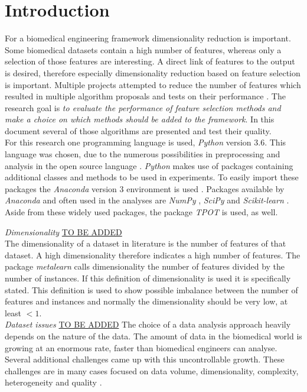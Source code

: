 \documentclass[10pt,a4paper]{report}
\begin{document}
	\section{Introduction}
	\label{FSsec:Introduction}
	
	For a biomedical engineering framework dimensionality reduction is important.  Some biomedical datasets contain a high number of features, whereas only a selection of those features are interesting. A direct link of features to the output is desired, therefore especially dimensionality reduction based on feature selection is important. Multiple projects attempted to reduce the number of features \cite{baumgartner2006data, welthagen2005comprehensive} which resulted in multiple algorithm proposals \cite{lim2003planar, peng2010novel, biesiada2007feature, ding2005minimum} and tests on their performance \cite{catal2009investigating, liu2002comparative}. The research goal is \emph{to evaluate the performance of feature selection methods and make a choice on which methods should be added to the framework}. In this document several of those algorithms are presented and test their quality.
	\\
	
	For this research one programming language is used, \textit{Python} version 3.6. This language was chosen, due to the numerous possibilities in preprocessing and analysis in the open source language \cite{mckinney2010data}. \textit{Python} makes use of packages containing additional classes and methods to be used in experiments. To easily import these packages the \textit{Anaconda} version 3 environment is used \cite{yan2018hands}. Packages available by \textit{Anaconda} and often used in the analyses are \textit{NumPy} \cite{walt2011NumPy}, \textit{SciPy} \cite{jones2014SciPy} and \textit{Scikit-learn} \cite{pedregosa2011scikit}. Aside from these widely used packages, the package \textit{TPOT} \cite{olson2016tpot} is used, as well.
	
	\textit{Dimensionality} \underline{TO BE ADDED}\\
	The dimensionality of a dataset in literature is the number of features of that dataset\cite{yu2003feature,lim2003planar,biesiada2007feature}. A high dimensionality therefore indicates a high number of features. The package \textit{metalearn} calls dimensionality the number of features divided by the number of instances. If this definition of dimensionality is used it is specifically stated. This definition is used to show possible imbalance between the number of features and instances and normally the dimensionality should be very low, at least $<1$.
	\\	
	\textit{Dataset issues} \underline{TO BE ADDED}
	The choice of a data analysis approach heavily depends on the nature of the data. The amount of data in the biomedical world is growing at an enormous rate, faster than biomedical engineers can analyse. Several additional challenges came up with this uncontrollable growth. These challenges are in many cases focused on data volume, dimensionality, complexity, heterogeneity and quality \cite{chen2006medical, doi:10.1093/bib/bbx044}.
	
\end{document}
